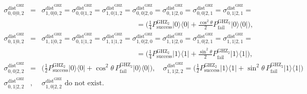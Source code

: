 \documentclass[reprint,superscriptaddress,nofootinbib,amsmath,amssymb,aps,pra,longbibliography]{revtex4-1}
\begin{document}
\begin{widetext}
\begin{eqnarray}
    \sigma_{0,0|0,2}^{\text{dist}^{\text{GHZ}}} &=& \sigma_{1,0|0,2}^{\text{dist}^{\text{GHZ}}} = \sigma_{0,0|1,2}^{\text{dist}^{\text{GHZ}}} = \sigma_{1,0|1,2}^{\text{dist}^{\text{GHZ}}} = \sigma_{0,0|2,0}^{\text{dist}^{\text{GHZ}}} = \sigma_{0,1|2,0}^{\text{dist}^{\text{GHZ}}} = \sigma_{0,0|2,1}^{\text{dist}^{\text{GHZ}}} = \sigma_{0,1|2,1}^{\text{dist}^{\text{GHZ}}} = \nonumber \\
    & & \quad \quad \quad \quad \quad \quad \hspace{3cm} =\Big(\frac{1}{4} P^{\text{GHZ}_2}_{\text{success}} | 0 \rangle \langle 0 | + \frac{\cos^2 \theta}{2} P^{\text{GHZ}_2}_{\text{fail}}  | 0 \rangle \langle 0 | \Big), \nonumber \\
    \sigma_{0,1|0,2}^{\text{dist}^{\text{GHZ}}} &=& \sigma_{1,1|0,2}^{\text{dist}^{\text{GHZ}}} = \sigma_{0,1|1,2}^{\text{dist}^{\text{GHZ}}} = \sigma_{1,1|1,2}^{\text{dist}^{\text{GHZ}}} = \sigma_{1,0|2,0}^{\text{dist}^{\text{GHZ}}} = \sigma_{1,1|2,0}^{\text{dist}^{\text{GHZ}}} = \sigma_{1,0|2,1}^{\text{dist}^{\text{GHZ}}} = \sigma_{1,1|2,1}^{\text{dist}^{\text{GHZ}}} = \nonumber \\
    & & \quad \quad \quad \quad \quad \quad \hspace{3cm} = \Big(\frac{1}{4} P^{\text{GHZ}_2}_{\text{success}} | 1 \rangle \langle 1 | + \frac{ \sin^2 \theta}{2} P^{\text{GHZ}_2}_{\text{fail}}  | 1 \rangle \langle 1 | \Big), \nonumber \\
	\sigma_{0,0|2,2}^{\text{dist}^{\text{GHZ}}} &=& \Big(\frac{1}{2} P^{\text{GHZ}_2}_{\text{success}} | 0 \rangle\langle 0 | + \cos^2 \theta \, P^{\text{GHZ}_2}_{\text{fail}}  | 0 \rangle \langle 0 |\Big),\quad  \sigma_{1,1|2,2}^{\text{dist}^{\text{GHZ}}} = \Big(\frac{1}{2} P^{\text{GHZ}_2}_{\text{success}} | 1 \rangle \langle 1 | + \sin^2 \theta \, P^{\text{GHZ}_2}_{\text{fail}}  | 1 \rangle \langle 1 | \Big) \nonumber \\
	\sigma_{0,1|2,2}^{\text{dist}^{\text{GHZ}}}&,& \sigma_{1,0|2,2}^{\text{dist}^{\text{GHZ}}} \text{ do not exist.}
	\label{GGHZ2Sdistassemblage}
\end{eqnarray}


\end{widetext}
\end{document}

